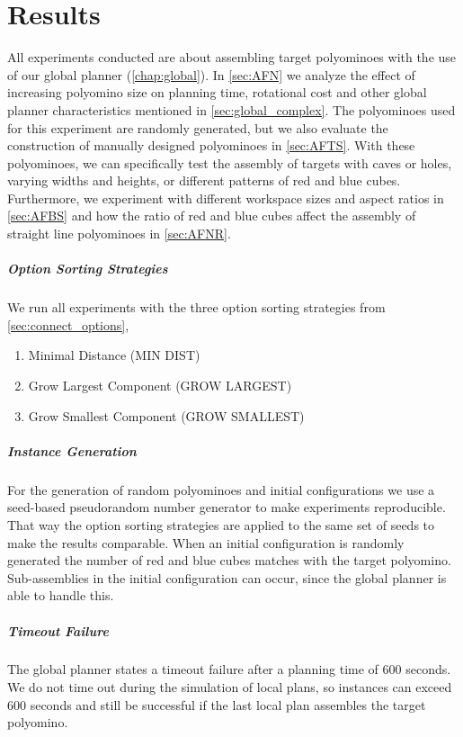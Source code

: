 \chapter{Results}
\label{chap:results}

All experiments conducted are about assembling target polyominoes with the use of our global planner (\autoref{chap:global}).
In \autoref{sec:AFN} we analyze the effect of increasing polyomino size on planning time, rotational cost and other global planner characteristics mentioned in \autoref{sec:global_complex}.
The polyominoes used for this experiment are randomly generated, but we also evaluate the construction of manually designed polyominoes in \autoref{sec:AFTS}.
With these polyominoes, we can specifically test the assembly of targets with caves or holes, varying widths and heights, or different patterns of red and blue cubes. 
Furthermore, we experiment with different workspace sizes and aspect ratios in \autoref{sec:AFBS} and how the ratio of red and blue cubes affect the assembly of straight line polyominoes in \autoref{sec:AFNR}.

\paragraph{Option Sorting Strategies}
We run all experiments with the three option sorting strategies from \autoref{sec:connect_options},
\begin{enumerate}
	\item Minimal Distance (MIN DIST)
	\item Grow Largest Component (GROW LARGEST)
	\item Grow Smallest Component (GROW SMALLEST)
\end{enumerate}

\paragraph{Instance Generation}
For the generation of random polyominoes and initial configurations we use a seed-based pseudorandom number generator to make experiments reproducible.
That way the option sorting strategies are applied to the same set of seeds to make the results comparable.
When an initial configuration is randomly generated the number of red and blue cubes matches with the target polyomino.
Sub-assemblies in the initial configuration can occur, since the global planner is able to handle this.

\paragraph{Timeout Failure}
The global planner states a timeout failure after a planning time of $600$ seconds.
We do not time out during the simulation of local plans, so instances can exceed $600$ seconds and still be successful if the last local plan assembles the target polyomino.

